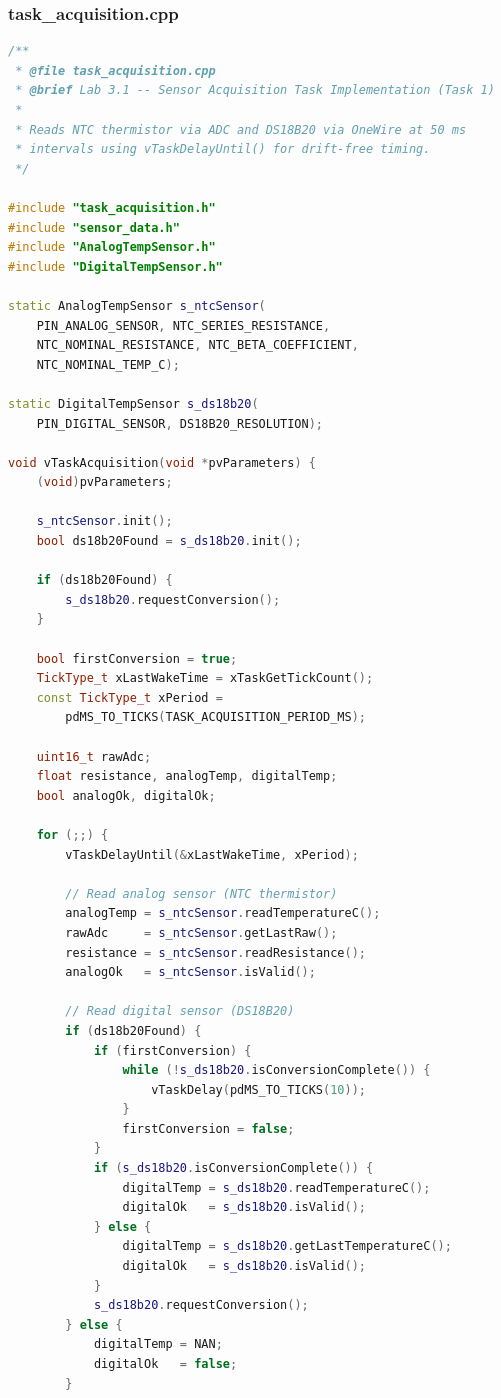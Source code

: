\subsubsection{task\_acquisition.cpp}
\begin{lstlisting}[language=C++, caption=task\_acquisition.cpp --- Sensor Acquisition Task Implementation]
/**
 * @file task_acquisition.cpp
 * @brief Lab 3.1 -- Sensor Acquisition Task Implementation (Task 1)
 *
 * Reads NTC thermistor via ADC and DS18B20 via OneWire at 50 ms
 * intervals using vTaskDelayUntil() for drift-free timing.
 */

#include "task_acquisition.h"
#include "sensor_data.h"
#include "AnalogTempSensor.h"
#include "DigitalTempSensor.h"

static AnalogTempSensor s_ntcSensor(
    PIN_ANALOG_SENSOR, NTC_SERIES_RESISTANCE,
    NTC_NOMINAL_RESISTANCE, NTC_BETA_COEFFICIENT,
    NTC_NOMINAL_TEMP_C);

static DigitalTempSensor s_ds18b20(
    PIN_DIGITAL_SENSOR, DS18B20_RESOLUTION);

void vTaskAcquisition(void *pvParameters) {
    (void)pvParameters;

    s_ntcSensor.init();
    bool ds18b20Found = s_ds18b20.init();

    if (ds18b20Found) {
        s_ds18b20.requestConversion();
    }

    bool firstConversion = true;
    TickType_t xLastWakeTime = xTaskGetTickCount();
    const TickType_t xPeriod =
        pdMS_TO_TICKS(TASK_ACQUISITION_PERIOD_MS);

    uint16_t rawAdc;
    float resistance, analogTemp, digitalTemp;
    bool analogOk, digitalOk;

    for (;;) {
        vTaskDelayUntil(&xLastWakeTime, xPeriod);

        // Read analog sensor (NTC thermistor)
        analogTemp = s_ntcSensor.readTemperatureC();
        rawAdc     = s_ntcSensor.getLastRaw();
        resistance = s_ntcSensor.readResistance();
        analogOk   = s_ntcSensor.isValid();

        // Read digital sensor (DS18B20)
        if (ds18b20Found) {
            if (firstConversion) {
                while (!s_ds18b20.isConversionComplete()) {
                    vTaskDelay(pdMS_TO_TICKS(10));
                }
                firstConversion = false;
            }
            if (s_ds18b20.isConversionComplete()) {
                digitalTemp = s_ds18b20.readTemperatureC();
                digitalOk   = s_ds18b20.isValid();
            } else {
                digitalTemp = s_ds18b20.getLastTemperatureC();
                digitalOk   = s_ds18b20.isValid();
            }
            s_ds18b20.requestConversion();
        } else {
            digitalTemp = NAN;
            digitalOk   = false;
        }


\end{lstlisting}
